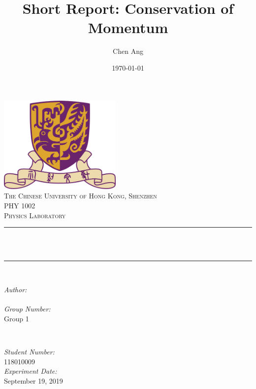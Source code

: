 \documentclass[12pt]{article}
\title{Short Report: Conservation of Momentum}                             %
\author{Chen Ang}                               %
\date{\today}                                           %
\makeatletter
\let\thetitle\@title
\let\theauthor\@author
\let\thedate\@date
\makeatother
\begin{document}

\begin{titlepage}
    \centering
    \vspace*{0.5 cm}
    \includegraphics[scale = 0.75,width=6cm]{CUHK}\\[1.0 cm]   %
    \textsc{\large The Chinese University of Hong Kong, Shenzhen}\\[2.0 cm]   %
    \textsc{\Large PHY 1002}\\[0.5 cm]               %
    \textsc{\large Physics Laboratory}\\[0.5 cm]               %
    \rule{\linewidth}{0.2 mm} \\[0.4 cm]
    { \huge \bfseries \thetitle}\\
    \rule{\linewidth}{0.2 mm} \\[1.5 cm]
    
    \begin{minipage}{0.4\textwidth}
        \begin{flushleft} \large
            \emph{Author:}\\
            \theauthor
            \\
            \emph{Group Number:} \\
            Group 1
            \end{flushleft}
            \end{minipage}~
            \begin{minipage}{0.4\textwidth}
            \begin{flushright} \large
            \emph{Student Number:} \\
            118010009                                   %
            \\
            \emph{Experiment Date:}\\
            September 19, 2019
        \end{flushright}
    \end{minipage}\\[2 cm]
    
    {\large \thedate}\\[2 cm]
 
    \vfill
    
\end{titlepage}


\tableofcontents
\pagebreak


\end{document}
